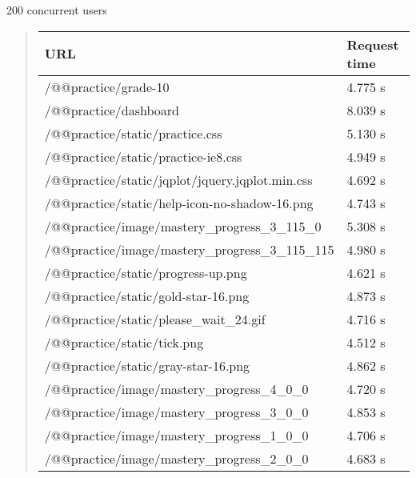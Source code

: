 \documentclass[letterpaper,10pt,english]{sphinxmanual}
\begin{document}
200 concurrent users
\begin{quote}

\begin{tabulary}{\linewidth}{|L|L|}
\hline
\textbf{\relax 
URL
} & \textbf{\relax 
Request time
}\\\hline

/@@practice/grade-10
 & 
4.775 s
\\\hline

/@@practice/dashboard
 & 
8.039 s
\\\hline

/@@practice/static/practice.css
 & 
5.130 s
\\\hline

/@@practice/static/practice-ie8.css
 & 
4.949 s
\\\hline

/@@practice/static/jqplot/jquery.jqplot.min.css
 & 
4.692 s
\\\hline

/@@practice/static/help-icon-no-shadow-16.png
 & 
4.743 s
\\\hline

/@@practice/image/mastery\_progress\_3\_115\_0
 & 
5.308 s
\\\hline

/@@practice/image/mastery\_progress\_3\_115\_115
 & 
4.980 s
\\\hline

/@@practice/static/progress-up.png
 & 
4.621 s
\\\hline

/@@practice/static/gold-star-16.png
 & 
4.873 s
\\\hline

/@@practice/static/please\_wait\_24.gif
 & 
4.716 s
\\\hline

/@@practice/static/tick.png
 & 
4.512 s
\\\hline

/@@practice/static/gray-star-16.png
 & 
4.862 s
\\\hline

/@@practice/image/mastery\_progress\_4\_0\_0
 & 
4.720 s
\\\hline

/@@practice/image/mastery\_progress\_3\_0\_0
 & 
4.853 s
\\\hline

/@@practice/image/mastery\_progress\_1\_0\_0
 & 
4.706 s
\\\hline

/@@practice/image/mastery\_progress\_2\_0\_0
 & 
4.683 s
\\\hline


\end{tabulary}
\end{quote}
\end{document}
